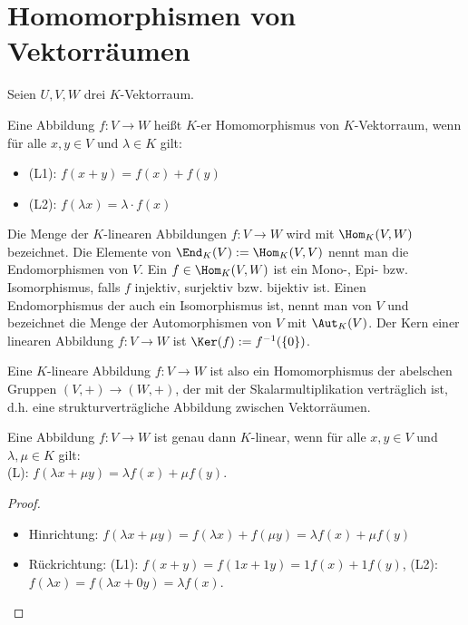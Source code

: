 \section{Homomorphismen von Vektorräumen}

Seien $U,V,W$ drei $K$-Vektorraum. \\

\begin{definition}[linear]
	Eine Abbildung $f: V \to W$ heißt $K$-er Homomorphismus von $K$-Vektorraum, wenn für 
	alle $x,y\in V$ und $\lambda\in K$ gilt:
	\begin{itemize}
		\item (L1): $f(x+y)=f(x)+f(y)$
		\item (L2): $f(\lambda x)=\lambda \cdot f(x)$
	\end{itemize}
	Die Menge der $K$-linearen Abbildungen $f: V\to W$ wird mit $\Hom_K(V,W)$ bezeichnet. Die Elemente von $\End_K(V)
	:= \Hom_K(V,V)$ nennt man die Endomorphismen von $V$. Ein $f\in \Hom_K(V,W)$ ist ein Mono-, Epi- bzw. Isomorphismus, 
	falls $f$ injektiv, surjektiv bzw. bijektiv ist. Einen Endomorphismus der auch ein Isomorphismus ist, nennt man 
	 von $V$ und bezeichnet die Menge der Automorphismen von $V$ mit $\Aut_K(V)$. Der Kern einer linearen 
	Abbildung $f: V\to W$ ist $\Ker(f):= f^{-1}(\{0\})$.
\end{definition}

\begin{remark}
	Eine $K$-lineare Abbildung $f: V\to W$ ist also ein Homomorphismus der abelschen Gruppen $(V,+) 
	\to(W,+)$, der mit der Skalarmultiplikation verträglich ist, d.h. eine strukturverträgliche Abbildung zwischen Vektorräumen.
\end{remark}

\begin{proposition}
	Eine Abbildung $f: V\to W$ ist genau dann $K$-linear, wenn für alle $x,y\in V$ und $\lambda,
	\mu\in K$ gilt: \\
	(L): $f(\lambda x +\mu y)=\lambda f(x) + \mu f(y)$.
\end{proposition}
\begin{proof}
	\begin{itemize}
		\item Hinrichtung: $f(\lambda x +\mu y)=f(\lambda x) + f(\mu y)=\lambda f(x) + \mu f(y)$
		\item Rückrichtung: (L1): $f(x+y)=f(1x+1y)=1f(x)+1f(y)$, (L2): $f(\lambda x)=f(\lambda x+0y)=\lambda f(x)$.
	\end{itemize}
\end{proof}

